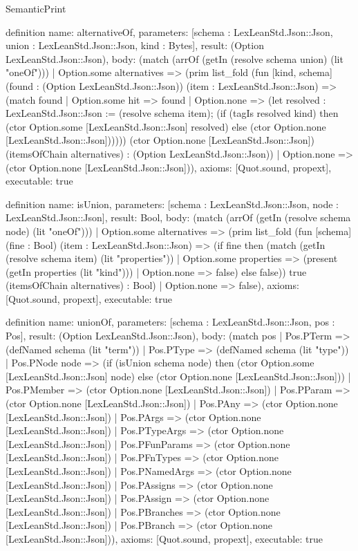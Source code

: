 \begin{lexlean}{SemanticPrint}
\begin{semanticmodule}
definition{
  name: alternativeOf,
  parameters: [schema : LexLeanStd.Json::Json, union : LexLeanStd.Json::Json, kind : Bytes],
  result: (Option LexLeanStd.Json::Json),
  body: (match (arrOf (getIn (resolve schema union) (lit "oneOf")))
    | Option.some alternatives => (prim list_fold (fun [kind, schema] (found : (Option LexLeanStd.Json::Json)) (item : LexLeanStd.Json::Json) => (match found
      | Option.some hit => found
      | Option.none => (let resolved : LexLeanStd.Json::Json := (resolve schema item); (if (tagIs resolved kind) then (ctor Option.some [LexLeanStd.Json::Json] resolved) else (ctor Option.none [LexLeanStd.Json::Json]))))) (ctor Option.none [LexLeanStd.Json::Json]) (itemsOfChain alternatives) : (Option LexLeanStd.Json::Json))
    | Option.none => (ctor Option.none [LexLeanStd.Json::Json])),
  axioms: [Quot.sound, propext],
  executable: true
}

definition{
  name: isUnion,
  parameters: [schema : LexLeanStd.Json::Json, node : LexLeanStd.Json::Json],
  result: Bool,
  body: (match (arrOf (getIn (resolve schema node) (lit "oneOf")))
    | Option.some alternatives => (prim list_fold (fun [schema] (fine : Bool) (item : LexLeanStd.Json::Json) => (if fine then (match (getIn (resolve schema item) (lit "properties"))
      | Option.some properties => (present (getIn properties (lit "kind")))
      | Option.none => false) else false)) true (itemsOfChain alternatives) : Bool)
    | Option.none => false),
  axioms: [Quot.sound, propext],
  executable: true
}

definition{
  name: unionOf,
  parameters: [schema : LexLeanStd.Json::Json, pos : Pos],
  result: (Option LexLeanStd.Json::Json),
  body: (match pos
    | Pos.PTerm => (defNamed schema (lit "term"))
    | Pos.PType => (defNamed schema (lit "type"))
    | Pos.PNode node => (if (isUnion schema node) then (ctor Option.some [LexLeanStd.Json::Json] node) else (ctor Option.none [LexLeanStd.Json::Json]))
    | Pos.PMember => (ctor Option.none [LexLeanStd.Json::Json])
    | Pos.PParam => (ctor Option.none [LexLeanStd.Json::Json])
    | Pos.PAny => (ctor Option.none [LexLeanStd.Json::Json])
    | Pos.PArgs => (ctor Option.none [LexLeanStd.Json::Json])
    | Pos.PTypeArgs => (ctor Option.none [LexLeanStd.Json::Json])
    | Pos.PFunParams => (ctor Option.none [LexLeanStd.Json::Json])
    | Pos.PFnTypes => (ctor Option.none [LexLeanStd.Json::Json])
    | Pos.PNamedArgs => (ctor Option.none [LexLeanStd.Json::Json])
    | Pos.PAssigns => (ctor Option.none [LexLeanStd.Json::Json])
    | Pos.PAssign => (ctor Option.none [LexLeanStd.Json::Json])
    | Pos.PBranches => (ctor Option.none [LexLeanStd.Json::Json])
    | Pos.PBranch => (ctor Option.none [LexLeanStd.Json::Json])),
  axioms: [Quot.sound, propext],
  executable: true
}


\end{semanticmodule}
\end{lexlean}
